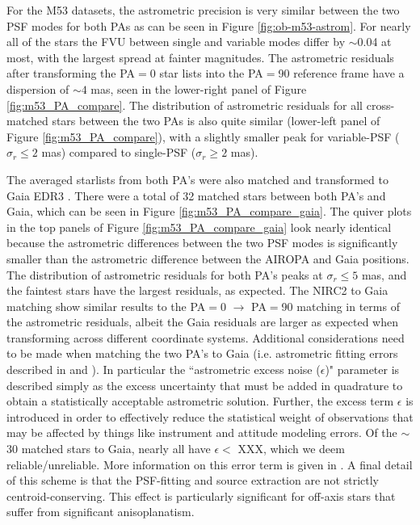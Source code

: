 \documentclass[]{spie}  %
\begin{document}
For the M53 datasets, the astrometric precision is very similar between the two PSF modes for both PAs as can be seen in Figure \ref{fig:ob-m53-astrom}. For nearly all of the stars the FVU between single and variable modes differ by ${\sim}$0.04 at most, with the largest spread at fainter magnitudes. The astrometric residuals after transforming the PA$=$0 star lists into the PA$=$90 reference frame have a dispersion of ${\sim}4$ mas, seen in the lower-right panel of Figure \ref{fig:m53_PA_compare}. The distribution of astrometric residuals for all cross-matched stars between the two PAs is also quite similar (lower-left panel of Figure \ref{fig:m53_PA_compare}), with a slightly smaller peak for variable-PSF ($\sigma_{r}\leq2$ mas) compared to single-PSF ($\sigma_{r}\geq2$ mas). 

The averaged starlists from both PA's were also matched and transformed to Gaia EDR3 \citep{brown:2021a}. There were a total of 32 matched stars between both PA's and Gaia, which can be seen in Figure \ref{fig:m53_PA_compare_gaia}. The quiver plots in the top panels of Figure \ref{fig:m53_PA_compare_gaia} look nearly identical because the astrometric differences between the two PSF modes is significantly smaller than the astrometric difference between the AIROPA and Gaia positions. The distribution of astrometric residuals for both PA's peaks at $\sigma_{r}\leq5$ mas, and the faintest stars have the largest residuals, as expected. The NIRC2 to Gaia matching show similar results to the PA$=$0 $\rightarrow$ PA$=$90 matching in terms of the astrometric residuals, albeit the Gaia residuals are larger as expected when transforming across different coordinate systems. Additional considerations need to be made when matching the two PA's to Gaia (i.e. astrometric fitting errors described in \cite{brown:2018a} and \cite{brown:2021a}). In particular the ``astrometric excess noise ($\epsilon$)" parameter is described simply as the excess uncertainty that must be added in quadrature to obtain a statistically acceptable astrometric solution. Further, the excess term $\epsilon$ is introduced in order to effectively reduce the statistical weight of observations that may be affected by things like instrument and attitude modeling errors. Of the ${\sim}$30 matched stars to Gaia, nearly all have $\epsilon < $ XXX, which we deem reliable/unreliable. More information on this error term is given in \cite{lindegren:2012a}. A final detail of this scheme is that the PSF-fitting and source extraction are not strictly centroid-conserving. This effect is particularly significant for off-axis stars that suffer from significant anisoplanatism.
\end{document}
